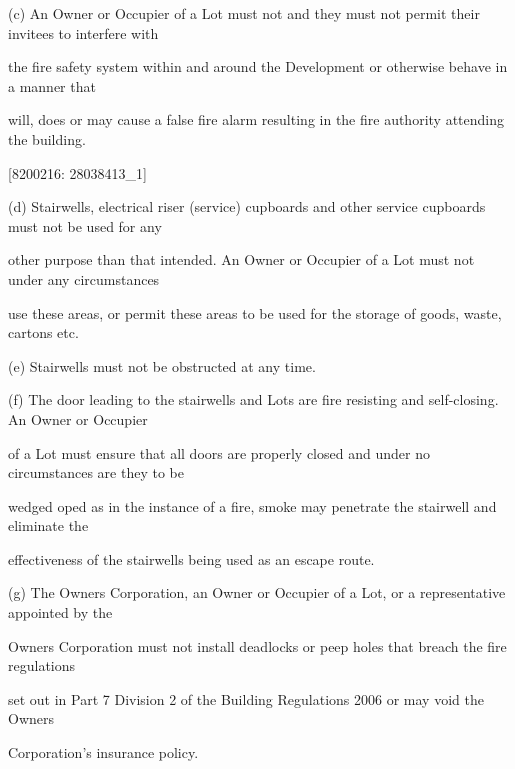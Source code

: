 \documentclass{article}
\begin{document}
{\fontsize{9.962}{1}(c) An Owner or Occupier of a Lot must not and they must not permit their invitees to interfere with }

{\fontsize{10.02}{1}the fire safety system within and around the Development or otherwise behave in a manner that }

{\fontsize{10.02}{1}will, does or may cause a false fire alarm resulting in the fire authority attending the building. }

\newpage
















{\fontsize{7.02}{1}[8200216: 28038413\_1] }


{\fontsize{9.962}{1}(d) Stairwells, electrical riser (service) cupboards and other service cupboards must not be used for any }

{\fontsize{10.02}{1}other purpose than that intended. An Owner or Occupier of a Lot must not under any circumstances }

{\fontsize{10.02}{1}use these areas, or permit these areas to be used for the storage of goods, waste, cartons etc. }

{\fontsize{9.962}{1}(e) Stairwells must not be obstructed at any time. }

{\fontsize{9.962}{1}(f) The door leading to the stairwells and Lots are fire resisting and self-closing. An Owner or Occupier }

{\fontsize{10.02}{1}of a Lot must ensure that all doors are properly closed and under no circumstances are they to be }

{\fontsize{10.02}{1}wedged oped as in the instance of a fire, smoke may penetrate the stairwell and eliminate the }

{\fontsize{10.02}{1}effectiveness of the stairwells being used as an escape route. }

{\fontsize{9.962}{1}(g) The Owners Corporation, an Owner or Occupier of a Lot, or a representative appointed by the }

{\fontsize{10.02}{1}Owners Corporation must not install deadlocks or peep holes that breach the fire regulations }

{\fontsize{10.02}{1}set out in Part 7 Division 2 of the Building Regulations 2006 or may void the Owners }

{\fontsize{10.02}{1}Corporation’s insurance policy. }
\end{document}
